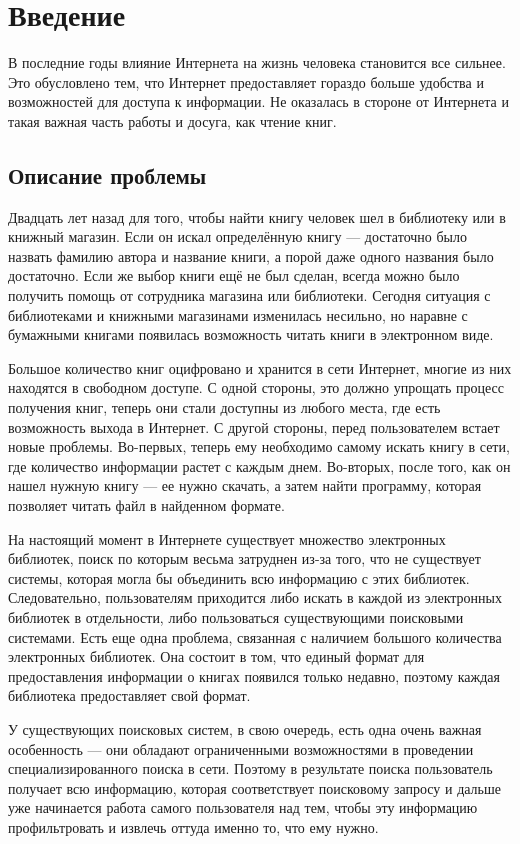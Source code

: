 
\section{Введение}
В последние годы влияние Интернета на жизнь человека становится все сильнее. Это обусловлено тем, что Интернет предоставляет гораздо больше удобства и возможностей для доступа к информации. Не оказалась в стороне от Интернета и такая важная часть работы и досуга, как чтение книг.

\subsection{Описание проблемы}
Двадцать лет назад для того, чтобы найти книгу человек шел в библиотеку или в книжный магазин. Если он искал определённую книгу --- достаточно было назвать фамилию автора и название книги, а порой даже одного названия было достаточно. Если же выбор книги ещё не был сделан, всегда можно было получить помощь от сотрудника магазина или библиотеки. Сегодня ситуация с библиотеками и книжными магазинами изменилась несильно, но наравне с бумажными книгами появилась возможность читать книги в электронном виде. 

Большое количество книг оцифровано и хранится в сети Интернет, многие из них находятся в свободном доступе. С одной стороны, это должно упрощать процесс получения книг, \tk теперь они стали доступны из любого места, где есть возможность выхода в Интернет. С другой стороны, перед пользователем встает новые проблемы. Во-первых, теперь ему необходимо самому искать книгу в сети, где количество информации растет с каждым днем. Во-вторых, после того, как он нашел нужную книгу --- ее нужно скачать, а затем найти программу, которая позволяет читать файл в найденном формате. 

На настоящий момент в Интернете существует множество электронных библиотек, поиск по которым весьма затруднен из-за того, что не существует системы, которая могла бы объединить всю информацию с этих библиотек. Следовательно, пользователям приходится либо искать в каждой из электронных библиотек в отдельности, либо пользоваться существующими поисковыми системами. Есть еще одна проблема, связанная с наличием большого количества электронных библиотек. Она состоит в том, что единый формат для предоставления информации о книгах появился только недавно, поэтому каждая библиотека предоставляет свой формат.

У существующих поисковых систем, в свою очередь,  есть одна очень важная особенность --- они обладают ограниченными возможностями в проведении специализированного поиска в сети. Поэтому в результате поиска пользователь получает всю информацию, которая соответствует поисковому запросу и дальше уже начинается работа самого пользователя над тем, чтобы эту информацию профильтровать и извлечь оттуда именно то, что ему нужно. 

